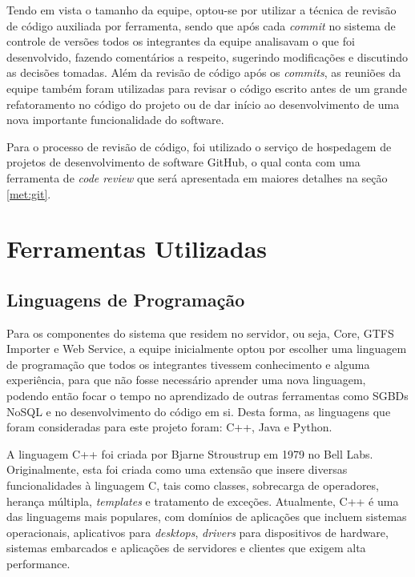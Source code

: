 Tendo em vista o tamanho da equipe, optou-se por utilizar a técnica de revisão de código auxiliada por ferramenta, sendo que após cada \emph{commit} no sistema de controle de versões todos os integrantes da equipe analisavam o que foi desenvolvido, fazendo comentários a respeito, sugerindo modificações e discutindo as decisões tomadas.
Além da revisão de código após os \emph{commits}, as reuniões da equipe também foram utilizadas para revisar o código escrito antes de um grande refatoramento no código do projeto ou de dar início ao desenvolvimento de uma nova importante funcionalidade do software.

Para o processo de revisão de código, foi utilizado o serviço de hospedagem de projetos de desenvolvimento de software GitHub, o qual conta com uma ferramenta de \emph{code review} que será apresentada em maiores detalhes na seção \ref{met:git}.


\section{Ferramentas Utilizadas}

\subsection{Linguagens de Programação}

Para os componentes do sistema que residem no servidor, ou seja, Core, GTFS Importer e Web Service, a equipe inicialmente optou por escolher uma linguagem de programação que todos os integrantes tivessem conhecimento e alguma experiência, para que não fosse necessário aprender uma nova linguagem, podendo então focar o tempo no aprendizado de outras ferramentas como SGBDs NoSQL e no desenvolvimento do código em si.
Desta forma, as linguagens que foram consideradas para este projeto foram: C++, Java e Python.

A linguagem C++ foi criada por Bjarne Stroustrup em 1979 no Bell Labs.
Originalmente, esta foi criada como uma extensão que insere diversas funcionalidades à linguagem C, tais como classes, sobrecarga de operadores, herança múltipla, \emph{templates} e tratamento de exceções.
Atualmente, C++ é uma das linguagems mais populares, com domínios de aplicações que incluem sistemas operacionais, aplicativos para \emph{desktops}, \emph{drivers} para dispositivos de hardware, sistemas embarcados e aplicações de servidores e clientes que exigem alta performance.

